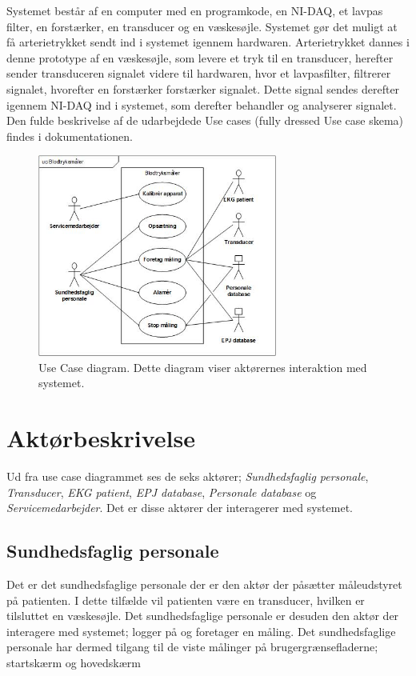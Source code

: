 Systemet består af en computer med en programkode, en NI-DAQ, et lavpas filter, en forstærker, en transducer og en væskesøjle.
Systemet gør det muligt at få arterietrykket sendt ind i systemet igennem hardwaren. Arterietrykket dannes i denne prototype af en væskesøjle, som levere et tryk til en transducer, herefter sender transduceren signalet videre til hardwaren, hvor et lavpasfilter, filtrerer signalet, hvorefter en forstærker forstærker signalet. Dette signal sendes derefter igennem NI-DAQ ind i systemet, som derefter behandler og analyserer signalet.\\
Den fulde beskrivelse af de udarbejdede Use cases (fully dressed Use case skema) findes i dokumentationen.
\begin{figure}[H]
\includegraphics[width =0.7\textwidth , center]{billeder/UseCaseDiagram}
\caption{Use Case diagram. Dette diagram viser aktørernes interaktion med systemet.}
\end{figure}
\section{Aktørbeskrivelse}
Ud fra use case diagrammet ses de seks aktører; \textit{Sundhedsfaglig personale}, \textit{Transducer}, \textit{EKG patient}, \textit{EPJ database}, \textit{Personale database} og \textit{Servicemedarbejder}. Det er disse aktører der interagerer med systemet.
\subsection{Sundhedsfaglig personale}
Det er det sundhedsfaglige personale der er den aktør der påsætter måleudstyret på patienten. I dette tilfælde vil patienten være en transducer, hvilken er tilsluttet en væskesøjle. Det sundhedsfaglige personale er desuden den aktør der interagere med systemet; logger på og foretager en måling. Det sundhedsfaglige personale har dermed tilgang til de viste målinger på brugergrænsefladerne; startskærm og hovedskærm
